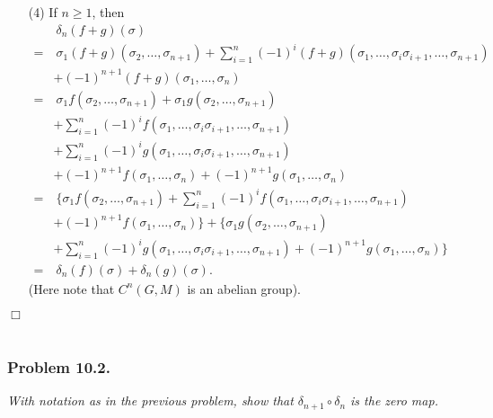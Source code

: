 \documentclass{article}
\begin{document}
\begin{enumerate}
\item[(4)]
  If $n \geq 1$, then
  \begin{align*}
    & \:
    \delta_n(f + g)(\sigma) \\
    = & \:
    \sigma_1 (f + g)(\sigma_2, \ldots, \sigma_{n+1})
    + \sum_{i=1}^{n} (-1)^{i}
        (f + g)(\sigma_1, \ldots, \sigma_i \sigma_{i+1}, \ldots, \sigma_{n+1}) \\
    & + (-1)^{n+1} (f + g)(\sigma_1, \ldots, \sigma_{n}) \\
    = & \:
    \sigma_1 f(\sigma_2, \ldots, \sigma_{n+1}) + \sigma_1 g(\sigma_2, \ldots, \sigma_{n+1}) \\
    & + \sum_{i=1}^{n} (-1)^{i}
        f(\sigma_1, \ldots, \sigma_i \sigma_{i+1}, \ldots, \sigma_{n+1}) \\
    & + \sum_{i=1}^{n} (-1)^{i}
        g(\sigma_1, \ldots, \sigma_i \sigma_{i+1}, \ldots, \sigma_{n+1}) \\
    & + (-1)^{n+1} f(\sigma_1, \ldots, \sigma_{n}) + (-1)^{n+1} g(\sigma_1, \ldots, \sigma_{n}) \\
    = & \:
    \Bigg\{ \sigma_1 f(\sigma_2, \ldots, \sigma_{n+1}) + \sum_{i=1}^{n} (-1)^{i}
        f(\sigma_1, \ldots, \sigma_i \sigma_{i+1}, \ldots, \sigma_{n+1}) \\
    & + (-1)^{n+1} f(\sigma_1, \ldots, \sigma_{n}) \Bigg\}
        + \Bigg\{ \sigma_1 g(\sigma_2, \ldots, \sigma_{n+1}) \\
    & + \sum_{i=1}^{n} (-1)^{i}
        g(\sigma_1, \ldots, \sigma_i \sigma_{i+1}, \ldots, \sigma_{n+1})
        + (-1)^{n+1} g(\sigma_1, \ldots, \sigma_{n}) \Bigg\} \\
    = & \:
    \delta_n(f)(\sigma) + \delta_n(g)(\sigma).
  \end{align*}
  (Here note that $C^{n}(G,M)$ is an abelian group).
\end{enumerate}
$\Box$ \\\\






\subsubsection*{Problem 10.2.}
\emph{With notation as in the previous problem,
show that $\delta_{n+1} \circ \delta_n$ is the zero map.} \\
\end{document}
